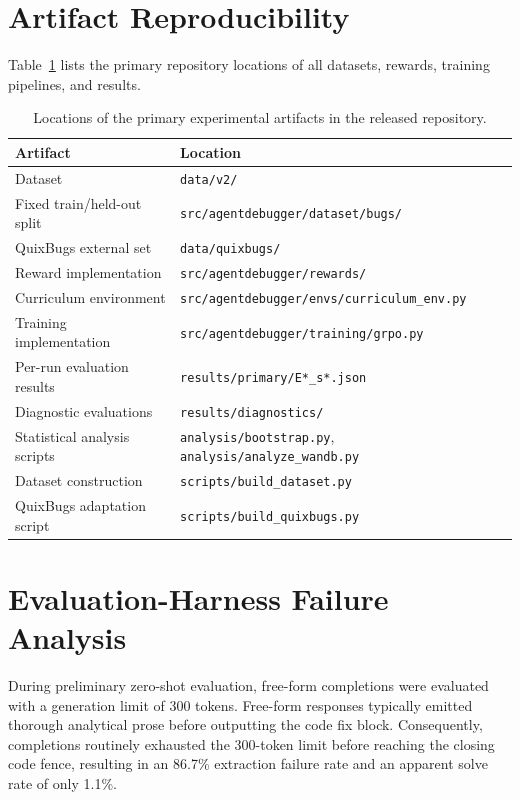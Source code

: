 \documentclass{article}
\begin{document}
\section{Artifact Reproducibility}
\label{app:artifact}

Table~\ref{tab:artifacts} lists the primary repository locations of all datasets, rewards, training pipelines, and results.

\begin{table}[h]
\centering
\small
\begin{tabular}{ll}
\toprule
\textbf{Artifact} & \textbf{Location} \\
\midrule
Dataset & \texttt{data/v2/} \\
Fixed train/held-out split & \texttt{src/agentdebugger/dataset/bugs/} \\
QuixBugs external set & \texttt{data/quixbugs/} \\
Reward implementation & \texttt{src/agentdebugger/rewards/} \\
Curriculum environment & \texttt{src/agentdebugger/envs/curriculum\_env.py} \\
Training implementation & \texttt{src/agentdebugger/training/grpo.py} \\
Per-run evaluation results & \texttt{results/primary/E*\_s*.json} \\
Diagnostic evaluations & \texttt{results/diagnostics/} \\
Statistical analysis scripts & \texttt{analysis/bootstrap.py}, \texttt{analysis/analyze\_wandb.py} \\
Dataset construction & \texttt{scripts/build\_dataset.py} \\
QuixBugs adaptation script & \texttt{scripts/build\_quixbugs.py} \\
\bottomrule
\end{tabular}
\caption{Locations of the primary experimental artifacts in the released repository.}
\label{tab:artifacts}
\end{table}

\section{Evaluation-Harness Failure Analysis}
\label{app:harness}

During preliminary zero-shot evaluation, free-form completions were evaluated with a generation limit of 300 tokens. Free-form responses typically emitted thorough analytical prose before outputting the code fix block. Consequently, completions routinely exhausted the 300-token limit before reaching the closing code fence, resulting in an 86.7\% extraction failure rate and an apparent solve rate of only 1.1\%. 
\end{document}
